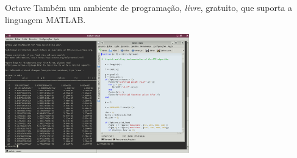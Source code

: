 \documentclass[hyperref={pdfpagelabels=false}]{beamer}
\begin{document}
\begin{frame}{Octave}
  Também um ambiente de programação, \emph{livre}, gratuito, que suporta a linguagem MATLAB.
  \begin{center}
    \includegraphics[width=8cm]{img/octave.png}
  \end{center}
\end{frame}
\end{document}
